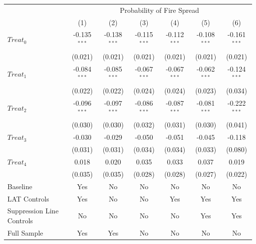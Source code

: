 \begingroup
\centering
\begin{tabular}{lcccccc}
   \toprule
    & \multicolumn{6}{c}{Probability of Fire Spread}\\
                             & (1)            & (2)            & (3)            & (4)            & (5)            & (6)\\  
   \midrule 
   $Treat_0$                 & -0.135$^{***}$ & -0.138$^{***}$ & -0.115$^{***}$ & -0.112$^{***}$ & -0.108$^{***}$ & -0.161$^{***}$\\   
                             & (0.021)        & (0.021)        & (0.021)        & (0.021)        & (0.021)        & (0.021)\\   
   $Treat_1$                 & -0.084$^{***}$ & -0.085$^{***}$ & -0.067$^{***}$ & -0.067$^{***}$ & -0.062$^{***}$ & -0.124$^{***}$\\   
                             & (0.022)        & (0.022)        & (0.024)        & (0.024)        & (0.023)        & (0.034)\\   
   $Treat_2$                 & -0.096$^{***}$ & -0.097$^{***}$ & -0.086$^{***}$ & -0.087$^{***}$ & -0.081$^{***}$ & -0.222$^{***}$\\   
                             & (0.030)        & (0.030)        & (0.032)        & (0.031)        & (0.030)        & (0.041)\\   
   $Treat_3$                 & -0.030         & -0.029         & -0.050         & -0.051         & -0.045         & -0.118\\   
                             & (0.031)        & (0.031)        & (0.034)        & (0.034)        & (0.033)        & (0.080)\\   
   $Treat_4$                 & 0.018          & 0.020          & 0.035          & 0.033          & 0.037          & 0.019\\   
                             & (0.035)        & (0.035)        & (0.028)        & (0.028)        & (0.027)        & (0.022)\\   
   Baseline                  & Yes            & No             & No             & No             & No             & No\\  
   LAT Controls              & Yes            & No             & No             & Yes            & Yes            & Yes\\  
   Suppression Line Controls & No             & No             & No             & No             & Yes            & Yes\\  
   Full Sample               & Yes            & Yes            & No             & No             & No             & No\\  

\end{tabular}
